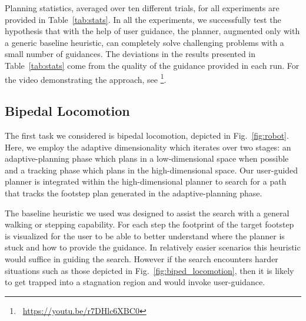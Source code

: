 \documentclass{article}
\begin{document}
Planning statistics, averaged over ten different trials, for all experiments are provided in Table~\ref{tab:stats}.
In all the experiments, we successfully test the hypothesis that with the help of user guidance, the planner, augmented only with a generic baseline heuristic, can completely solve challenging problems with a small number of guidances.
The deviations in the results presented in Table~\ref{tab:stats} come from the quality of the guidance provided in each run.
For the video demonstrating the approach, see \footnote{~\url{https://youtu.be/r7DHlc6XBC0}}.


\subsection{Bipedal Locomotion}
\label{subsec:locomotion}




The first task we considered is bipedal locomotion, depicted in Fig.~\ref{fig:robot}.
Here, we employ the adaptive dimensionality 
which iterates over two stages: an adaptive-planning phase which plans in a low-dimensional space when possible and a tracking phase which plans in the high-dimensional space.
Our user-guided planner is integrated within the high-dimensional planner to search for a path that tracks the footstep plan generated in the adaptive-planning  phase. 

The baseline heuristic we used was designed to assist the search with a general walking or stepping capability. For each step the footprint of the target footstep is visualized for the user to be able to better understand where the planner is stuck and how to provide the guidance. In relatively easier scenarios this heuristic would suffice in guiding the search. However if the search encounters harder situations such as those depicted in Fig.~\ref{fig:biped_locomotion}, then it is likely to get trapped into a stagnation region and would invoke user-guidance.
\end{document}
